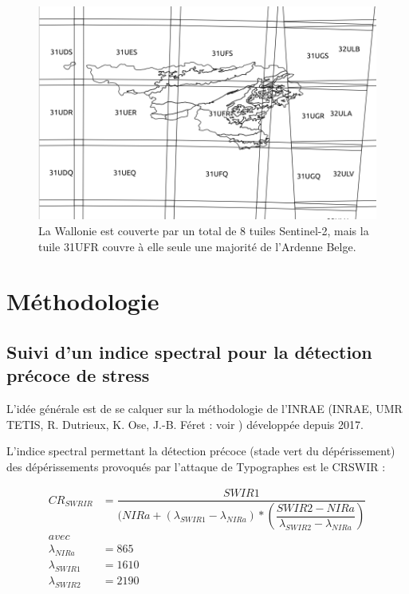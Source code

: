 \documentclass[a4paper, 12pt]{article} %
\begin{document}
\begin{figure}[H]
\centering
\includegraphics[width=0.9\linewidth]{../theia_d/tuileS2Nom.png}
\caption{La Wallonie est couverte par un total de 8 tuiles Sentinel-2, mais la tuile 31UFR couvre à elle seule une majorité de l'Ardenne Belge.}
\label{fig:tuileRW}
\end{figure}

\section{Méthodologie}

\subsection{Suivi d'un indice spectral pour la détection précoce de stress}\label{subsec:methodo}


L'idée générale est de se calquer sur la méthodologie de l'INRAE (INRAE, UMR TETIS, R. Dutrieux, K. Ose, J.-B. Féret : voir \cite{dutrieux_package_2021,dutrieux_mise_2021}) développée depuis 2017. 

L'indice spectral permettant la détection précoce (stade vert du dépérissement) des dépérissements provoqués par l'attaque de Typographes est le CRSWIR :

\begin{align*} 
CR_{SWRIR} &= \dfrac{SWIR1}{( NIRa + (\lambda_{SWIR1}-\lambda_{NIRa})* (\dfrac{SWIR2 - NIRa}{\lambda_{SWIR2}-\lambda_{NIRa}})} \\ 
avec&\\ 
\lambda_{NIRa} &=865\\ 
\lambda_{SWIR1} &=1610\\ 
\lambda_{SWIR2} &=2190
\end{align*} 
\end{document}
